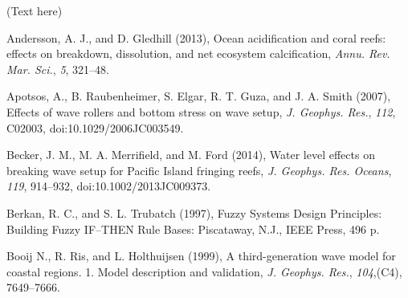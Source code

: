 \documentclass[default,jgrga]{agutex2015}
\begin{document}
\begin{article}
\begin{acknowledgments}
(Text here)
\end{acknowledgments}

%
%
%
%
%
%
%
%
%

\begin{thebibliography}{}

Andersson, A. J., and D. Gledhill (2013), Ocean acidification and coral reefs: effects on breakdown, dissolution, and net ecosystem calcification, \textit{Annu. Rev. Mar. Sci.}, \textit{5}, 321--48.

Apotsos, A., B. Raubenheimer, S. Elgar, R. T. Guza, and J. A. Smith (2007), Effects of wave rollers and bottom stress on wave setup, \textit{J. Geophys. Res.}, \textit{112}, C02003, doi:10.1029/2006JC003549.

Becker, J. M., M. A. Merrifield, and M. Ford (2014), Water level effects on breaking wave setup for Pacific Island fringing reefs, \textit{J. Geophys. Res. Oceans}, \textit{119}, 914--932, doi:10.1002/2013JC009373.

Berkan, R. C., and S. L. Trubatch (1997), Fuzzy Systems Design Principles: Building Fuzzy IF–THEN Rule Bases: Piscataway, N.J., IEEE Press, 496 p.

Booij N., R. Ris, and L. Holthuijsen (1999), A third-generation wave model for coastal regions. 1. Model description and validation, \textit{J. Geophys. Res.}, \textit{104},(C4), 7649--7666.


\end{thebibliography}
\end{article}
\end{document}
